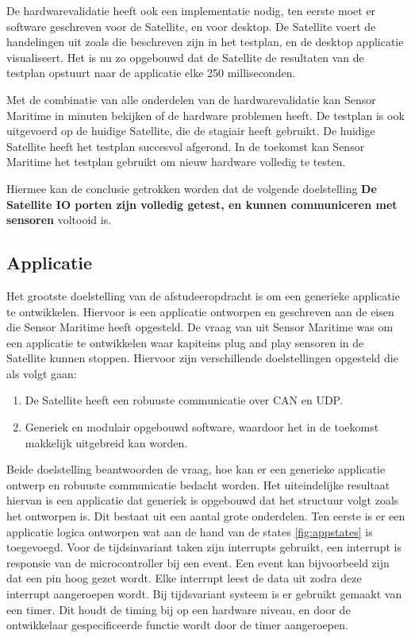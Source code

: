 \noindent De hardwarevalidatie heeft ook een implementatie nodig, ten eerste moet er software geschreven voor de Satellite, en voor desktop. De Satellite voert de handelingen uit zoals die beschreven zijn in het testplan, en de desktop applicatie visualiseert. Het is nu zo opgebouwd dat de Satellite de resultaten van de testplan opstuurt naar de applicatie elke 250 milliseconden. \newline

\noindent Met de combinatie van alle onderdelen van de hardwarevalidatie kan Sensor Maritime in minuten bekijken of de hardware problemen heeft. De testplan is ook uitgevoerd op de huidige Satellite, die de stagiair heeft gebruikt. De huidige Satellite heeft het testplan succesvol afgerond. In de toekomst kan Sensor Maritime het testplan gebruikt om nieuw hardware volledig te testen. \newline

\noindent Hiermee kan de conclusie getrokken worden dat de volgende doelstelling \textbf{De Satellite IO porten zijn volledig getest, en kunnen communiceren met sensoren} voltooid is.

\subsection{Applicatie}
Het grootste doelstelling van de afstudeeropdracht is om een generieke applicatie te ontwikkelen. Hiervoor is een applicatie ontworpen en geschreven aan de eisen die Sensor Maritime heeft opgesteld. De vraag van uit Sensor Maritime was om een applicatie te ontwikkelen waar kapiteins plug and play sensoren in de Satellite kunnen stoppen. Hiervoor zijn verschillende doelstellingen opgesteld die als volgt gaan:
\begin{enumerate}
	\item De Satellite heeft een robuuste communicatie over CAN en UDP.
	\item Generiek en modulair opgebouwd software, waardoor het in de toekomst makkelijk uitgebreid kan worden.
\end{enumerate}

\noindent Beide doelstelling beantwoorden de vraag, hoe kan er een generieke applicatie ontwerp en robuuste communicatie bedacht worden. Het uiteindelijke resultaat hiervan is een applicatie dat generiek is opgebouwd dat het structuur volgt zoals het ontworpen is. Dit bestaat uit een aantal grote onderdelen. Ten eerste is er een applicatie logica ontworpen wat aan de hand van de states \ref{fig:appstates} is toegevoegd. Voor de tijdsinvariant taken zijn interrupts gebruikt, een interrupt is responsie van de microcontroller bij een event. Een event kan bijvoorbeeld zijn dat een pin hoog gezet wordt. Elke interrupt leest de data uit zodra deze interrupt aangeroepen wordt. Bij tijdsvariant systeem is er gebruikt gemaakt van een timer. Dit houdt de timing bij op een hardware niveau, en door de ontwikkelaar gespecificeerde functie wordt door de timer aangeroepen. \newline

